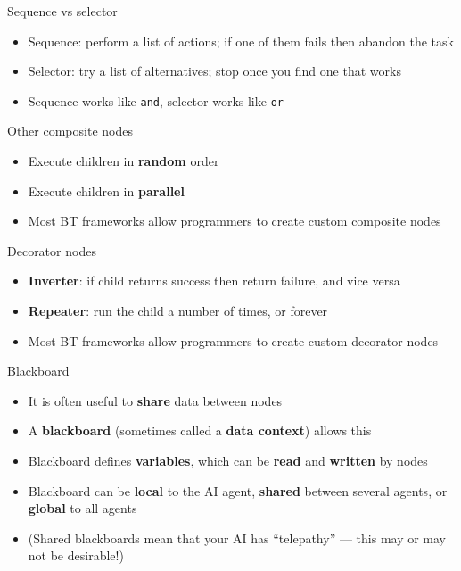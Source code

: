 \begin{frame}{Sequence vs selector}
	\begin{itemize}
		\pause\item Sequence: perform a list of actions; if one of them fails then abandon the task
		\pause\item Selector: try a list of alternatives; stop once you find one that works
		\pause\item Sequence works like \lstinline{and}, selector works like \lstinline{or}
	\end{itemize}
\end{frame}

\begin{frame}{Other composite nodes}
	\begin{itemize}
		\pause\item Execute children in \textbf{random} order
		\pause\item Execute children in \textbf{parallel}
		\pause\item Most BT frameworks allow programmers to create custom composite nodes
	\end{itemize}
\end{frame}

\begin{frame}{Decorator nodes}
	\begin{itemize}
		\pause\item \textbf{Inverter}: if child returns success then return failure, and vice versa
		\pause\item \textbf{Repeater}: run the child a number of times, or forever
		\pause\item Most BT frameworks allow programmers to create custom decorator nodes
	\end{itemize}
\end{frame}

\begin{frame}{Blackboard}
	\begin{itemize}
		\pause\item It is often useful to \textbf{share} data between nodes
		\pause\item A \textbf{blackboard} (sometimes called a \textbf{data context}) allows this
		\pause\item Blackboard defines \textbf{variables}, which can be \textbf{read} and \textbf{written} by nodes
		\pause\item Blackboard can be \textbf{local} to the AI agent, \textbf{shared} between several agents, or \textbf{global} to all agents
		\pause\item (Shared blackboards mean that your AI has ``telepathy'' --- this may or may not be desirable!)
	\end{itemize}
\end{frame}

